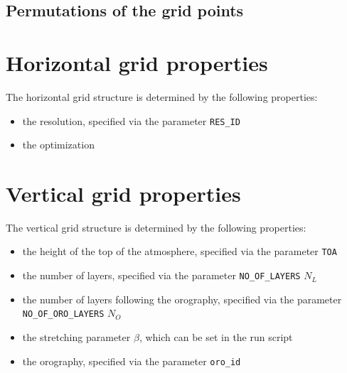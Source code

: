 \documentclass[10pt]{report}
\begin{document}
\subsection{Permutations of the grid points}
\label{sec:permutations_of_the_grid_points}

\section{Horizontal grid properties}
\label{sec:horizontal_grid_properties}

The horizontal grid structure is determined by the following properties:

\begin{itemize}
\item the resolution, specified via the parameter \texttt{RES\_ID}
\item the optimization
\end{itemize}

\section{Vertical grid properties}
\label{sec:vertical_grid_properties}

The vertical grid structure is determined by the following properties:

\begin{itemize}
\item the height of the top of the atmosphere, specified via the parameter \texttt{TOA}
\item the number of layers, specified via the parameter \texttt{NO\_OF\_LAYERS} $N_L$
\item the number of layers following the orography, specified via the parameter \texttt{NO\_OF\_ORO\_LAYERS} $N_O$
\item the stretching parameter $\beta$, which can be set in the run script
\item the orography, specified via the parameter \texttt{oro\_id}
\end{itemize}
\end{document}
